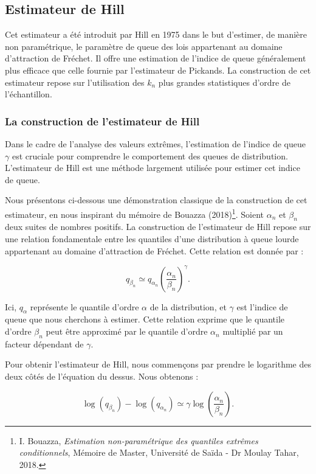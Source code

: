 \documentclass{article}
\theoremstyle{plain}
\theoremstyle{definition}
\theoremstyle{plain}
\begin{document}
\subsection{Estimateur de Hill}

\noindent Cet estimateur a été introduit par Hill en 1975 dans le but d’estimer, de manière non paramétrique, le paramètre de queue des lois appartenant au domaine d’attraction de Fréchet. Il offre une estimation de l’indice de queue généralement plus efficace que celle fournie par l’estimateur de Pickands. La construction de cet estimateur repose sur l’utilisation des $k_n$ plus grandes statistiques d’ordre de l’échantillon.



\subsubsection{La construction de l’estimateur de Hill}
\noindent Dans le cadre de l'analyse des valeurs extrêmes, l'estimation de l'indice de queue \(\gamma\) est cruciale pour comprendre le comportement des queues de distribution. L'estimateur de Hill est une méthode largement utilisée pour estimer cet indice de queue.

\noindent Nous présentons ci-dessous une démonstration classique de la construction de cet estimateur, en nous inspirant du mémoire de Bouazza (2018)\footnote{I. Bouazza, \textit{Estimation non-paramétrique des quantiles extrêmes conditionnels}, Mémoire de Master, Université de Saïda - Dr Moulay Tahar, 2018.}.
\noindent Soient \(\alpha_n\) et \(\beta_n\) deux suites de nombres positifs. La construction de l'estimateur de Hill repose sur une relation fondamentale entre les quantiles d’une distribution à queue lourde appartenant au domaine d’attraction de Fréchet. Cette relation est donnée par :

\[
    q_{\beta_n} \simeq q_{\alpha_n} \left( \frac{\alpha_n}{\beta_n} \right)^{\gamma}.
\]

\noindent Ici, \(q_{\alpha}\) représente le quantile d'ordre \(\alpha\) de la distribution, et \(\gamma\) est l'indice de queue que nous cherchons à estimer. Cette relation exprime que le quantile d'ordre \(\beta_n\) peut être approximé par le quantile d'ordre \(\alpha_n\) multiplié par un facteur dépendant de \(\gamma\).

\noindent Pour obtenir l'estimateur de Hill, nous commençons par prendre le logarithme des deux côtés de l'équation du dessus. Nous obtenons :

\[
\log(q_{\beta_n}) - \log(q_{\alpha_n}) \simeq \gamma \log\left( \frac{\alpha_n}{\beta_n} \right).
\]
\end{document}
